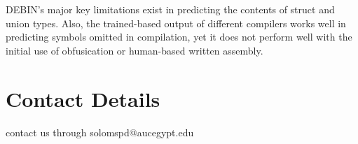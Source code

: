 \documentclass{article}
\begin{document}
\noindent DEBIN's major key limitations exist in predicting the contents of struct and union types. Also, the trained-based output of different compilers works well in predicting symbols omitted in compilation, yet it does not perform well with the initial use of obfusication or human-based written assembly.\\

\section{Contact Details}
contact us through solomspd@aucegypt.edu
\end{document}
